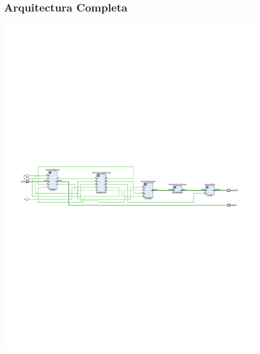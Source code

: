 \documentclass[8pt,executivepaper]{article}
\begin{document}
\subsection{Arquitectura Completa}
\begin{center}
  \includegraphics[scale=0.7]{rtl/cartaASM.pdf}
\end{center}
\end{document}

